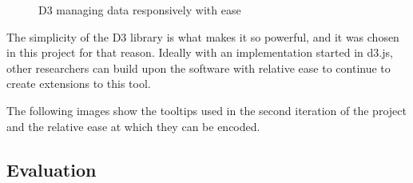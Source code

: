 \documentclass[a4paper,11pt,titlepage]{article}
\begin{document}
	\begin{figure}[H]
    			\caption{D3 managing data responsively with ease}%
	\end{figure}	
	
	The simplicity of the D3 library is what makes it so powerful, and it was chosen in this project for that reason. Ideally with an implementation started in d3.js, other researchers can build upon the software with relative ease to continue to create extensions to this tool. 
	\par 
	The following images show the tooltips used in the second iteration of the project and the relative ease at which they can be encoded.
	
	\begin{figure}[H]
    			\centering	
    			\qquad
    			\caption{ }%
    			\label{fig:iter2}
	\end{figure}	


	\subsection{Evaluation}
		
\end{document}
